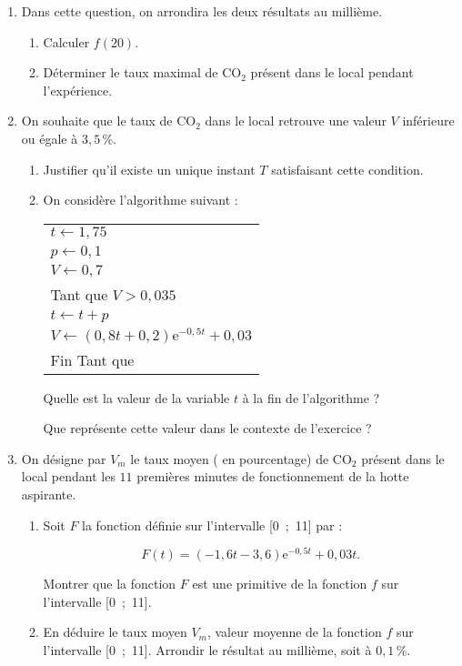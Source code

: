 \documentclass[10pt]{article}
\begin{document}
\bigskip

\begin{enumerate}
\item Dans cette question, on arrondira les deux résultats au millième.
	\begin{enumerate}
		\item Calculer $f (20)$.
		\item Déterminer le taux maximal de CO$_2$ présent dans le local pendant l'expérience.
 	\end{enumerate}
\item  On souhaite que le taux de CO$_2$ dans le local retrouve une valeur $V$ inférieure ou égale à $3,5$\,\%.
	\begin{enumerate}
		\item Justifier qu'il existe un unique instant $T$ satisfaisant cette condition.
		\item  On considère l'algorithme suivant :
		
\begin{center}
\begin{tabularx}{0.5\linewidth}{|X|}\hline
$t \gets 1,75$\\
$p \gets 0,1$\\
$V \gets 0,7$\\
Tant que $V > 0,035$\\
\hspace{0.75cm}$t \gets t + p$\\
\hspace{0.75cm}$V \gets (0,8t + 0,2)\text{e}^{-0,5t} + 0,03$\\
Fin Tant que\\ \hline
\end{tabularx}
\end{center}		
		
Quelle est la valeur de la variable $t$ à la fin de l'algorithme ?
		
Que représente cette valeur dans le contexte de l'exercice ?
 	\end{enumerate}
\item  On désigne par $V_m$ le taux moyen ( en pourcentage) de CO$_2$ présent dans le local pendant les $11$
premières minutes de fonctionnement de la hotte aspirante.
	\begin{enumerate}
		\item Soit $F$ la fonction définie sur l'intervalle [0~;~11] par : 
		
		\[F(t) = (-1,6t -3,6)\text{e}^{-0,5t} + 0,03t.\]
		
Montrer que la fonction $F$ est une primitive de la fonction $f$ sur l'intervalle [0~;~11].
		\item En déduire le taux moyen $V_m$, valeur moyenne de la fonction $f$ sur l'intervalle [0~;~11].
Arrondir le résultat au millième, soit à $0,1$\,\%.
	\end{enumerate}
\end{enumerate}
\end{document}
